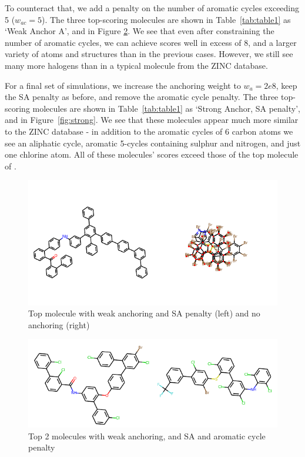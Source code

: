 \documentclass{article}
\begin{document}
To counteract that, we add a penalty on the number of aromatic cycles exceeding 5 ($w_{ac}=5$). The three top-scoring molecules are shown in Table~\ref{tab:table1} as `Weak Anchor A', and in Figure \ref{fig:weak}. We see that even after constraining the number of aromatic cycles, we can achieve scores well in excess of 8, and a larger variety of atoms and structures than in the previous cases. However, we still see many more halogens than in a typical molecule from the ZINC database.

For a final set of simulations, we increase the anchoring weight to $w_{a} =2e8$, keep the SA penalty as before, and remove the aromatic cycle penalty. The three top-scoring molecules are shown in Table~\ref{tab:table1} as `Strong Anchor, SA penalty', and in Figure~\ref{fig:strong}. We see that these molecules appear much more similar to the ZINC database - in addition to the aromatic cycles of 6 carbon atoms we see an aliphatic cycle, aromatic 5-cycles containing sulphur and nitrogen, and just one chlorine atom. All of these molecules' scores exceed those of the top molecule of \cite{jin18}.

\begin{figure}[ht]
	\centering
	\includegraphics[width=\columnwidth]{large.pdf}
	\caption{Top molecule with weak anchoring and SA penalty (left) and no anchoring (right)}	\label{fig:optim}
\end{figure}
\begin{figure}[ht]
	\centering
	\includegraphics[width=\columnwidth]{weak.pdf}
	\caption{Top 2 molecules with weak anchoring, and SA and aromatic cycle penalty}\label{fig:weak}
\end{figure}
\end{document}
